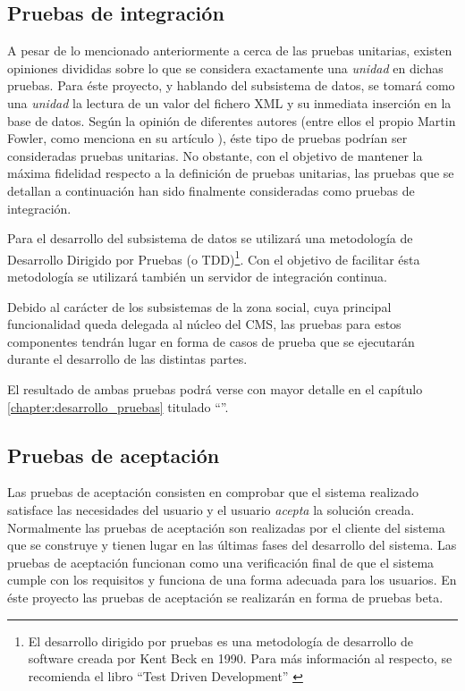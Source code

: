 \subsection{Pruebas de integración}
A pesar de lo mencionado anteriormente a cerca de las pruebas unitarias, existen opiniones divididas sobre lo que se considera exactamente una \textit{unidad} en dichas pruebas.  Para éste proyecto, y hablando del subsistema de datos, se tomará como una \textit{unidad} la lectura de un valor del fichero XML y su inmediata inserción en la base de datos.\newline
Según la opinión de diferentes autores (entre ellos el propio Martin Fowler, como menciona en su artículo \cite{mfowler:unit-testing}), éste tipo de pruebas podrían ser consideradas pruebas unitarias.  No obstante, con el objetivo de mantener la máxima fidelidad respecto a la definición de pruebas unitarias, las pruebas que se detallan a continuación han sido finalmente consideradas como pruebas de integración.

Para el desarrollo del subsistema de datos se utilizará una metodología de Desarrollo Dirigido por Pruebas (o TDD)\footnote{El desarrollo dirigido por pruebas es una metodología de desarrollo de software creada por Kent Beck en 1990.  Para más información al respecto, se recomienda el libro ``Test Driven Development'' \cite{kbeck:test-driven-development}}.  Con el objetivo de facilitar ésta metodología se utilizará también un servidor de integración continua.

Debido al carácter de los subsistemas de la zona social, cuya principal funcionalidad queda delegada al núcleo del CMS, las pruebas para estos componentes tendrán lugar en forma de casos de prueba que se ejecutarán durante el desarrollo de las distintas partes.  

El resultado de ambas pruebas podrá verse con mayor detalle en el capítulo \ref{chapter:desarrollo_pruebas} titulado ``''.


\subsection{Pruebas de aceptación}
Las pruebas de aceptación consisten en comprobar que el sistema realizado satisface las necesidades del usuario y el usuario \textit{acepta} la solución creada.  Normalmente las pruebas de aceptación son realizadas por el cliente del sistema que se construye y tienen lugar en las últimas fases del desarrollo del sistema.  Las pruebas de aceptación funcionan como una verificación final de que el sistema cumple con los requisitos y funciona de una forma adecuada para los usuarios.
En éste proyecto las pruebas de aceptación se realizarán en forma de pruebas beta.

